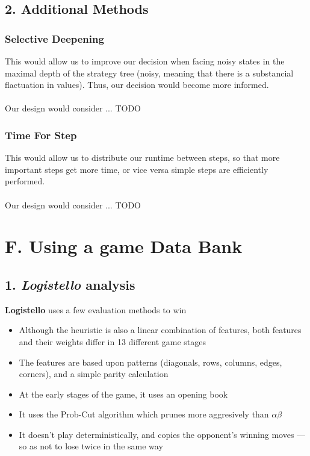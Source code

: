 \documentclass{article}
\begin{document}
\subsection*{2. Additional Methods}
\subsubsection*{Selective Deepening}
This would allow us to improve our decision when facing noisy states in the maximal depth of the strategy tree (noisy, meaning that there is a substancial flactuation in values). Thus, our decision would become more informed. \\~\\
Our design would consider ... TODO

\subsubsection*{Time For Step}
This would allow us to distribute our runtime between steps, so that more important steps get more time, or vice versa simple steps are efficiently performed. \\~\\
Our design would consider ... TODO

\section*{F. Using a game Data Bank}
\subsection*{1. \emph{Logistello} analysis}
\textbf{Logistello} uses a few evaluation methods to win
\begin{itemize}
\item Although the heuristic is also a linear combination of features, both features and their weights differ in 13 different game stages
\item The features are based upon patterns (diagonals, rows, columns, edges, corners), and a simple parity calculation
\item At the early stages of the game, it uses an opening book
\item It uses the Prob-Cut algorithm which prunes more aggresively than $\alpha\beta$
\item It doesn't play deterministically, and copies the opponent's winning moves --- so as not to lose twice in the same way
\end{itemize}
\end{document}
